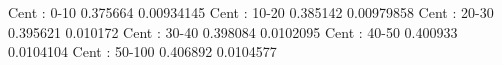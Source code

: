 Cent : 0-10
0.375664 0.00934145
Cent : 10-20
0.385142 0.00979858
Cent : 20-30
0.395621 0.010172
Cent : 30-40
0.398084 0.0102095
Cent : 40-50
0.400933 0.0104104
Cent : 50-100
0.406892 0.0104577
